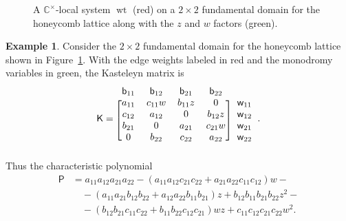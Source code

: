 \documentclass[dvipsnames,11pt]{article}
\theoremstyle{definition}
\newtheorem{example}[theorem]{Example}
\newcommand{\wt}{\operatorname{wt}}
\newcommand{\C}{{\mathbb C}}
\def\w{\mathsf w}
\def\b{\mathsf b}
\def\K{\mathsf K}
\newcommand{\ee}{\end{equation}}
\newcommand{\la}{\label}
\begin{document}
\begin{figure} \begin{center}  \end{center} \caption{A $\C^\times$-local system $\wt$ (red) on a $2 \times 2$ fundamental domain for the honeycomb lattice along with the $z$ and $w$ factors (green).} \la{fig:2x2} \end{figure}


\begin{example}
Consider the $2\times 2$ fundamental domain for the honeycomb lattice shown in Figure~\ref{fig:2x2}.
With the edge weights labeled in red and the monodromy variables in green, the Kasteleyn matrix is
\begin{align*}
\K=\begin{blockarray}{ccccc}
 \b_{11} & \b_{12} & \b_{21} & \b_{22}  \\
\begin{block}{[cccc]c}
  {a_{11}} & {{c_{11}} {w}} &  {b_{11}} {z}&0 &\w_{11}\\
  {c_{12}} & {a_{12}} &0& {b_{12}}{z}   &\w_{12}\\
{b_{21}}   & 0 &  {a_{21}} &{{c_{21}} {w}}&\w_{21}\\
  0& {b_{22}} &  {{c_{22}} } &{a_{22}}&\w_{22}\\
\end{block}
\end{blockarray}.
\end{align*}
Thus the characteristic polynomial
\begin{align}
\mathsf P
  &=a_{11} a_{12} a_{21} a_{22}-({a_{11} a_{12}
   c_{21} c_{22}}+a_{21} a_{22} c_{11} c_{12}) {w}-\nonumber\\
  &\quad-(a_{11} a_{21} b_{12}
   b_{22}+a_{12} a_{22} b_{11} b_{21})
  { z}+b_{12}
   b_{11} b_{21} b_{22} {z^2}-\nonumber\\
  &\quad-(b_{12} b_{21}
   c_{11} c_{22} +b_{11} b_{22} c_{12}
   c_{21}) {w z}+c_{11} c_{12} c_{21} c_{22} {w^2} .\la{p2x2}
\end{align}
\end{example}
\end{document}

